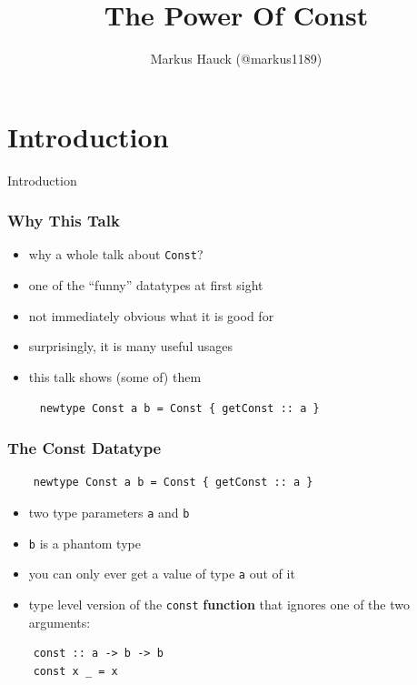 \documentclass[aspectratio=169]{beamer}
\title{The Power Of Const}
\author{Markus Hauck (@markus1189)}
\begin{document}
\begin{frame}
  \titlepage{}
\end{frame}

\section{Introduction}\label{sec:introduction}
\begin{frame}
  \begin{center}
    \Huge Introduction
  \end{center}
\end{frame}

\begin{frame}
  \frametitle{Why This Talk}
  \begin{itemize}
  \item why a whole talk about \texttt{Const}?
  \item one of the ``funny'' datatypes at first sight
  \item not immediately obvious what it is good for
  \item surprisingly, it is many useful usages
  \item this talk shows (some of) them
  \end{itemize}
\end{frame}

\begin{frame}[fragile]
  \begin{center}
    \begin{verbatim}
     newtype Const a b = Const { getConst :: a }
    \end{verbatim}
  \end{center}
\end{frame}

\begin{frame}[fragile]
  \frametitle{The Const Datatype}
  \begin{verbatim}
    newtype Const a b = Const { getConst :: a }
  \end{verbatim}
  \vfill
  \begin{itemize}
  \item two type parameters \texttt{a} and \texttt{b}
  \item \texttt{b} is a phantom type
  \item you can only ever get a value of type \texttt{a} out of it
  \item type level version of the \texttt{const} \textbf{function} that ignores one of
    the two arguments:
  \end{itemize}
  \vspace{5mm}
  \begin{verbatim}
    const :: a -> b -> b
    const x _ = x
  \end{verbatim}
\end{frame}
\end{document}

